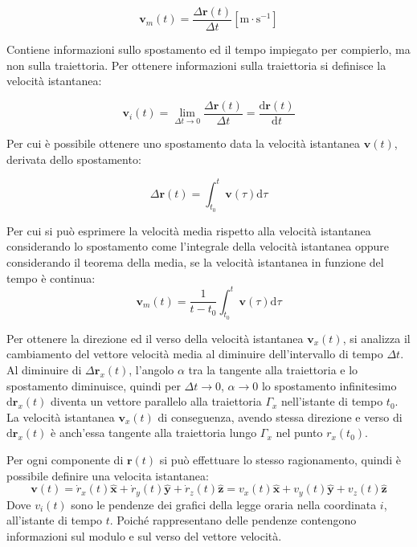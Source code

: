 \documentclass{article}
\newcommand{\vect}[1]{\boldsymbol{\mathbf{#1}}}
\newcommand{\df}{\mathrm{d}}
\numberwithin{equation}{subsection}
\begin{document}
\begin{equation}
    \vect{v}_m(t) = \displaystyle\frac{\Delta\vect{r}(t)}{\Delta t}\left[\mathrm{m}\cdot\mathrm{s}^{-1}\right]
\end{equation}

Contiene informazioni sullo spostamento ed il 
tempo impiegato per compierlo, ma non sulla traiettoria.
Per ottenere informazioni sulla traiettoria si definisce la velocità istantanea:

\begin{equation}
    \vect{v}_i(t) = \lim_{\Delta t \to 0} \displaystyle\frac{\Delta\vect{r}(t)}{\Delta t} = \displaystyle\frac{\df\vect{r}(t)}{\df t}
\end{equation}

Per cui è possibile ottenere uno spostamento data la velocità istantanea $\vect{v}(t)$, derivata dello spostamento:

\begin{equation}
    \Delta\vect{r}(t)=\displaystyle\int_{t_0}^{t}\vect v(\tau)\df\tau
\end{equation}

Per cui si può esprimere la velocità media rispetto alla velocità istantanea considerando lo spostamento come l'integrale della velocità istantanea 
oppure considerando il teorema della media, se la velocità istantanea in funzione del tempo è continua:
\begin{equation*}
    \vect{v}_m(t)=\displaystyle\frac{1}{t-t_0}\int_{t_0}^{t}\vect v(\tau)\df\tau
\end{equation*}


Per ottenere la direzione ed il verso della velocità istantanea $\vect{v}_x(t)$, si analizza il cambiamento del vettore velocità media al diminuire 
dell'intervallo di tempo $\Delta t$. Al diminuire di $\Delta\vect{r}_x(t)$, l'angolo $\alpha$ tra la tangente alla 
traiettoria e lo spostamento diminuisce, quindi per $\Delta t \to 0$, $\alpha \to 0$ 
lo spostamento infinitesimo $\df\vect{r}_x(t)$ diventa un 
vettore parallelo alla traiettoria $\Gamma_x$ nell'istante di 
tempo $t_0$. La velocità istantanea $\vect{v}_x(t)$ di conseguenza, avendo 
stessa direzione e verso di $\df\vect{r}_x(t)$ è anch'essa tangente alla traiettoria 
lungo $\Gamma_x$ nel punto $r_x(t_0)$.

Per ogni componente di $\vect{r}(t)$ 
si può effettuare lo stesso ragionamento, 
quindi è possibile definire una velocita istantanea: 
\begin{equation}
    \vect{v}(t) =\dot{r}_x(t)\hat{\vect{x}} +\dot{r}_y(t)\hat{\vect{y}} +\dot{r}_z(t)\hat{\vect{z}} = v_x(t)\hat{\vect{x}} + v_y(t)\hat{\vect{y}} + v_z(t)\hat{\vect{z}}
\end{equation}    
Dove ${v}_i(t)$ 
sono le pendenze dei grafici della legge oraria nella coordinata $i$, all'istante 
di tempo $t$. Poiché rappresentano delle pendenze contengono informazioni sul modulo e sul verso del vettore velocità. 
\end{document}
